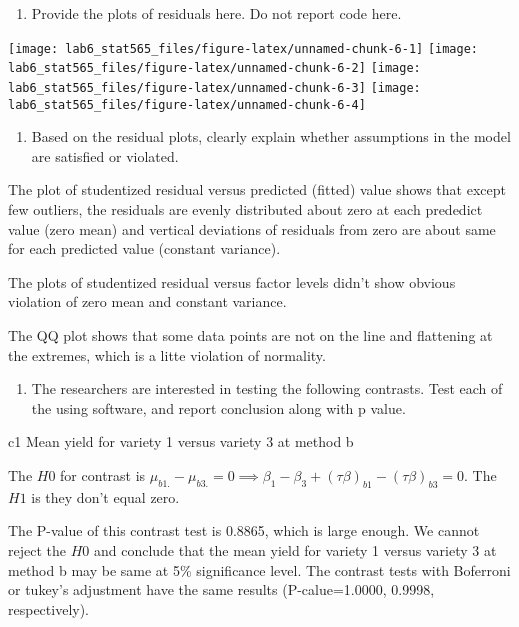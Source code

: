 \documentclass[]{article}
\providecommand{\tightlist}{%
  \setlength{\itemsep}{0pt}\setlength{\parskip}{0pt}}
\begin{document}
\begin{enumerate}
\def\labelenumi{(\alph{enumi})}
\setcounter{enumi}{4}
\tightlist
\item
  \textcolor[rgb]{0.5,0.5,0.5}{Provide the plots of residuals here. Do not report code here.}
\end{enumerate}

\texttt{[image: lab6\_stat565\_files/figure-latex/unnamed-chunk-6-1]}
\texttt{[image: lab6\_stat565\_files/figure-latex/unnamed-chunk-6-2]}
\texttt{[image: lab6\_stat565\_files/figure-latex/unnamed-chunk-6-3]}
\texttt{[image: lab6\_stat565\_files/figure-latex/unnamed-chunk-6-4]}

\begin{enumerate}
\def\labelenumi{(\alph{enumi})}
\setcounter{enumi}{5}
\tightlist
\item
  \textcolor[rgb]{0.5,0.5,0.5}{Based on the residual plots, clearly explain whether assumptions in the model are satisfied or violated.}
\end{enumerate}

The plot of studentized residual versus predicted (fitted) value shows
that except few outliers, the residuals are evenly distributed about
zero at each prededict value (zero mean) and vertical deviations of
residuals from zero are about same for each predicted value (constant
variance).

The plots of studentized residual versus factor levels didn't show
obvious violation of zero mean and constant variance.

The QQ plot shows that some data points are not on the line and
flattening at the extremes, which is a litte violation of normality.

\begin{enumerate}
\def\labelenumi{(\alph{enumi})}
\setcounter{enumi}{6}
\tightlist
\item
  \textcolor[rgb]{0.5,0.5,0.5}{The researchers are interested in testing the following contrasts. Test each of the using software, and report conclusion along with p value.}
\end{enumerate}

c1
\textcolor[rgb]{0.5,0.5,0.5}{Mean yield for variety 1 versus variety 3 at method b}

The \(H0\) for contrast is
\(\mu_{b1.}-\mu_{b3.}=0\implies\beta_{1}-\beta_{3}+(\tau\beta)_{b1}-(\tau\beta)_{b3}=0\).
The \(H1\) is they don't equal zero.

The P-value of this contrast test is 0.8865, which is large enough. We
cannot reject the \(H0\) and conclude that the mean yield for variety 1
versus variety 3 at method b may be same at 5\% significance level. The
contrast tests with Boferroni or tukey's adjustment have the same
results (P-calue=1.0000, 0.9998, respectively).
\end{document}

